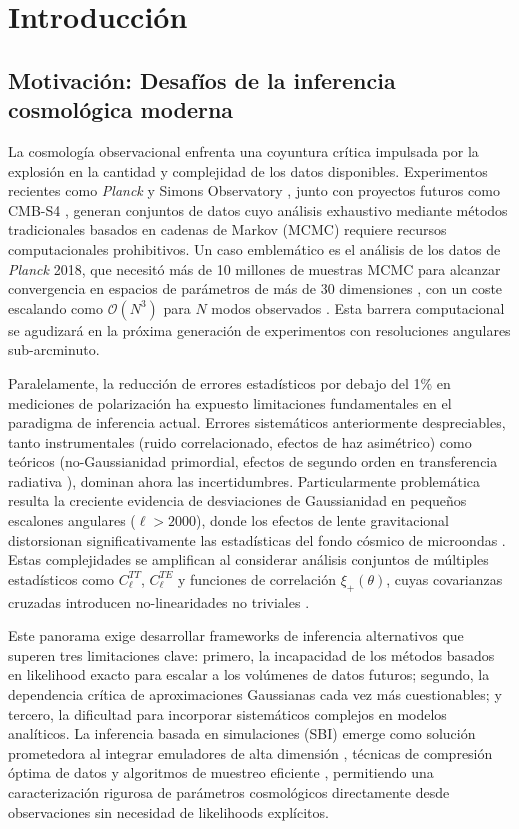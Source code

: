 \section{Introducción}
\subsection{Motivación: Desafíos de la inferencia cosmológica moderna}
La cosmología observacional enfrenta una coyuntura crítica impulsada por la explosión en la cantidad y complejidad de los datos disponibles. Experimentos recientes como \textit{Planck} \citep{Planck2018} y Simons Observatory \citep{SO2019}, junto con proyectos futuros como CMB-S4 \citep{CMB-S42016}, generan conjuntos de datos cuyo análisis exhaustivo mediante métodos tradicionales basados en cadenas de Markov (MCMC) requiere recursos computacionales prohibitivos. Un caso emblemático es el análisis de los datos de \textit{Planck} 2018, que necesitó más de 10 millones de muestras MCMC para alcanzar convergencia en espacios de parámetros de más de 30 dimensiones \citep{Planck2018}, con un coste escalando como $\mathcal{O}(N^3)$ para $N$ modos observados \citep{Schneider2020}. Esta barrera computacional se agudizará en la próxima generación de experimentos con resoluciones angulares sub-arcminuto.

Paralelamente, la reducción de errores estadísticos por debajo del 1\% en mediciones de polarización \citep{BICEP2021} ha expuesto limitaciones fundamentales en el paradigma de inferencia actual. Errores sistemáticos anteriormente despreciables, tanto instrumentales (ruido correlacionado, efectos de haz asimétrico) como teóricos (no-Gaussianidad primordial, efectos de segundo orden en transferencia radiativa \citep{Challinor2011}), dominan ahora las incertidumbres. Particularmente problemática resulta la creciente evidencia de desviaciones de Gaussianidad en pequeños escalones angulares ($\ell > 2000$), donde los efectos de lente gravitacional distorsionan significativamente las estadísticas del fondo cósmico de microondas \citep{Planck2018NL}. Estas complejidades se amplifican al considerar análisis conjuntos de múltiples estadísticos como $C_\ell^{TT}$, $C_\ell^{TE}$ y funciones de correlación $\xi_+(\theta)$, cuyas covarianzas cruzadas introducen no-linearidades no triviales \citep{EFS2004}.

Este panorama exige desarrollar frameworks de inferencia alternativos que superen tres limitaciones clave: primero, la incapacidad de los métodos basados en likelihood exacto para escalar a los volúmenes de datos futuros; segundo, la dependencia crítica de aproximaciones Gaussianas cada vez más cuestionables; y tercero, la dificultad para incorporar sistemáticos complejos en modelos analíticos. La inferencia basada en simulaciones (SBI) emerge como solución prometedora al integrar emuladores de alta dimensión \citep{Alsing2019}, técnicas de compresión óptima de datos \citep{Jeffrey2021} y algoritmos de muestreo eficiente \citep{Papamakarios2019}, permitiendo una caracterización rigurosa de parámetros cosmológicos directamente desde observaciones sin necesidad de likelihoods explícitos.

